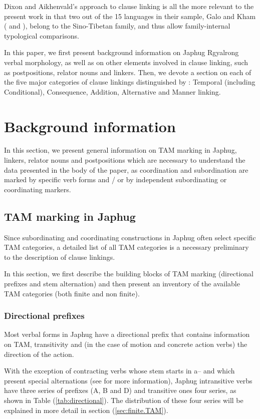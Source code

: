 \documentclass[oldfontcommands,oneside,a4paper,11pt]{article}
\newcommand{\ipa}[1]{{\phon \mbox{#1}}} %
\newcommand{\refb}[1]{(\ref{#1})}
\begin{document}
Dixon and Aikhenvald's approach to clause linking is all the more relevant to the present work in that two out of the 15 languages in their sample, Galo and Kham (\citealt{post09linking} and \citealt{watters09kham}), belong to the Sino-Tibetan family, and thus allow family-internal typological comparisons.

In this paper, we first present background information on Japhug Rgyalrong verbal morphology, as well as on other elements involved in clause linking, such as postpositions, relator nouns and linkers. Then, we devote a section on each of the five major categories of clause linkings distinguished by  \citet{dixon09intro}: Temporal (including Conditional), Consequence, Addition, Alternative and Manner linking. 

\section{Background information}
In this section, we present general information on TAM marking in Japhug, linkers, relator nouns and postpositions which are necessary to understand the data presented in the body of the paper, as coordination and subordination are marked   by specific verb forms and / or by independent subordinating or coordinating markers.
 

\subsection{TAM marking in Japhug}
Since subordinating and coordinating constructions in Japhug often select specific TAM categories, a detailed list of all TAM categories is a necessary preliminary to the description of clause linkings.

In this section, we first  describe the building blocks of TAM marking (directional prefixes and stem alternation) and then present an inventory of the available TAM categories (both finite and non finite).

\subsubsection{Directional prefixes} \label{sec:directional}
Most verbal forms in Japhug have a directional prefix that contains information on TAM, transitivity and  (in the case of motion and concrete action verbs) the direction of the action.

With the exception of contracting verbs whose stem starts in \ipa{a--} and which present special alternations (see \citealt{jacques07passif} for more information), Japhug intransitive verbs have three series of prefixes (A, B and D) and transitive ones four series, as shown in Table \refb{tab:directional}. The distribution of these four series will be explained in more detail in section \refb{sec:finite.TAM}.
\end{document}
